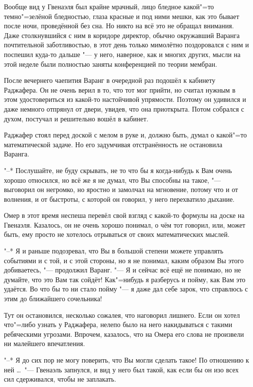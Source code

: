 Вообще вид у Гвенаэля был крайне мрачный, лицо бледное какой"=то темно"=зелёной
бледностью, глаза красные и под ними мешки, как это бывает после ночи,
проведённой без сна.
Но никто на всё это не обращал внимания.
Даже столкнувшийся с ним в коридоре директор, обычно окружавший Варанга
почтительной заботливостью, в этот день только мимолётно поздоровался с ним и
поспешил куда-то дальше "--- у него, наверное, как и многих других, мысли на
этой неделе были полностью заняты конференцией по теории мембран.

После вечернего чаепития Варанг в очередной раз подошёл к кабинету Раджафера.
Он не очень верил в то, что тот мог прийти, но считал нужным в этом
удостовериться из какой-то настойчивой упрямости.
Поэтому он удивился и даже немного отпрянул от двери, увидев, что она приоткрыта.
Потом собрался с духом, постучал и решительно вошёл в кабинет.

Раджафер стоял перед доской с мелом в руке и, должно быть, думал о какой"=то
математической задаче.
Но его задумчивая отстранённость не остановила Варанга.

"--* Послушайте, не буду скрывать, не то что бы я когда-нибудь к Вам очень
хорошо относился, но всё же я не думал, что Вы способны на такое, "--- выговорил
он негромко, но яростно и замолчал на мгновение, потому что и от волнения, и от
быстроты, с которой он говорил, у него перехватило дыхание.

Омер в этот время неспеша перевёл свой взгляд с какой-то формулы на доске на
Гвенаэля.
Казалось, он не очень хорошо понимал, о чём тот говорил, или, может быть, ему
просто не хотелось отрываться от своих математических мыслей.

"--* Я и раньше подозревал, что Вы в большой степени можете управлять событиями
и с той, и с этой стороны, но я не понимал, каким образом Вы этого добиваетесь,
"--- продолжил Варанг.
"--- Я и сейчас всё ещё не понимаю, но не думайте, что это Вам так сойдёт!
Как"=нибудь я разберусь и пойму, как Вам это удаётся.
Во что бы то ни стало пойму "--- я даже дал себе зарок, что справлюсь с этим до
ближайшего сочельника!

Тут он остановился, несколько сожалея, что наговорил лишнего.
Если он хотел что"=либо узнать у Раджафера, нелепо было на него накидываться с
такими ребяческими угрозами.
Впрочем, казалось, что на Омера его слова не произвели ни малейшего впечатления.

"--* Я до сих пор не могу поверить, что Вы могли сделать такое!
По отношению к ней \ldots\ "--- Гвенаэль запнулся, и вид у него был такой, как
если бы он изо всех сил сдерживался, чтобы не заплакать.


